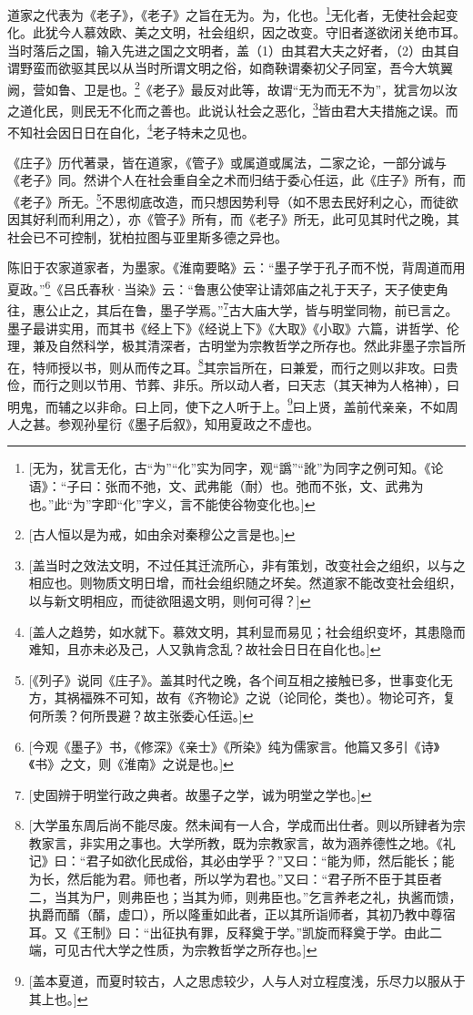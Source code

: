 道家之代表为《老子》，《老子》之旨在无为。为，化也。\footnote{[无为，犹言无化，古“为”“化”实为同字，观“譌”“訛”为同字之例可知。《论语》：“子曰：张而不弛，文、武弗能（耐）也。弛而不张，文、武弗为也。”此“为”字即“化”字义，言不能使谷物变化也。]}无化者，无使社会起变化。此犹今人慕效欧、美之文明，社会组织，因之改变。守旧者遂欲闭关绝市耳。当时落后之国，输入先进之国之文明者，盖（1）由其君大夫之好者，（2）由其自谓野蛮而欲驱其民以从当时所谓文明之俗，如商鞅谓秦初父子同室，吾今大筑翼阙，营如鲁、卫是也。\footnote{[古人恒以是为戒，如由余对秦穆公之言是也。]}《老子》最反对此等，故谓“无为而无不为”，犹言勿以汝之道化民，则民无不化而之善也。此说认社会之恶化，\footnote{[盖当时之效法文明，不过任其迁流所心，非有策划，改变社会之组织，以与之相应也。则物质文明日增，而社会组织随之坏矣。然道家不能改变社会组织，以与新文明相应，而徒欲阻遏文明，则何可得？]}皆由君大夫措施之误。而不知社会因日日在自化，\footnote{[盖人之趋势，如水就下。慕效文明，其利显而易见；社会组织变坏，其患隐而难知，且亦未必及己，人又孰肯念乱？故社会日日在自化也。]}老子特未之见也。

《庄子》历代著录，皆在道家，《管子》或属道或属法，二家之论，一部分诚与《老子》同。然讲个人在社会重自全之术而归结于委心任运，此《庄子》所有，而《老子》所无。\footnote{[《列子》说同《庄子》。盖其时代之晚，各个间互相之接触已多，世事变化无方，其祸福殊不可知，故有《齐物论》之说（论同伦，类也）。物论可齐，复何所羡？何所畏避？故主张委心任运。]}不思彻底改造，而只想因势利导（如不思去民好利之心，而徒欲因其好利而利用之），亦《管子》所有，而《老子》所无，此可见其时代之晚，其社会已不可控制，犹柏拉图与亚里斯多德之异也。

陈旧于农家道家者，为墨家。《淮南要略》云：“墨子学于孔子而不悦，背周道而用夏政。”\footnote{[今观《墨子》书，《修深》《亲士》《所染》纯为儒家言。他篇又多引《诗》《书》之文，则《淮南》之说是也。]}《吕氏春秋·当染》云：“鲁惠公使宰让请郊庙之礼于天子，天子使吏角往，惠公止之，其后在鲁，墨子学焉。”\footnote{[史固辨于明堂行政之典者。故墨子之学，诚为明堂之学也。]}古大庙大学，皆与明堂同物，前已言之。墨子最讲实用，而其书《经上下》《经说上下》《大取》《小取》六篇，讲哲学、伦理，兼及自然科学，极其清深者，古明堂为宗教哲学之所存也。然此非墨子宗旨所在，特师授以书，则从而传之耳。\footnote{[大学虽东周后尚不能尽废。然未闻有一人合，学成而出仕者。则以所肄者为宗教家言，非实用之事也。大学所教，既为宗教家言，故为涵养德性之地。《礼记》曰：“君子如欲化民成俗，其必由学乎？”又曰：“能为师，然后能长；能为长，然后能为君。师也者，所以学为君也。”又曰：“君子所不臣于其臣者二，当其为尸，则弗臣也；当其为师，则弗臣也。”乞言养老之礼，执酱而馈，执爵而醑（醑，虚口），所以隆重如此者，正以其所诣师者，其初乃教中尊宿耳。又《王制》曰：“出征执有罪，反释奠于学。”凯旋而释奠于学。由此二端，可见古代大学之性质，为宗教哲学之所存也。]}其宗旨所在，曰兼爱，而行之则以非攻。曰贵俭，而行之则以节用、节葬、非乐。所以动人者，曰天志（其天神为人格神），曰明鬼，而辅之以非命。曰上同，使下之人听于上。\footnote{[盖本夏道，而夏时较古，人之思虑较少，人与人对立程度浅，乐尽力以服从于其上也。]}曰上贤，盖前代亲亲，不如周人之甚。参观孙星衍《墨子后叙》，知用夏政之不虚也。

